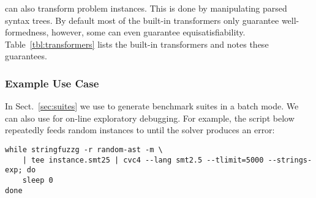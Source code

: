 \fuzzer{} can also transform problem instances.
This is done by manipulating parsed syntax trees.
By default most of the built-in transformers 
only guarantee well-formedness, however,
some can even guarantee equisatisfiability. Table~\ref{tbl:transformers} 
lists the built-in transformers and notes these guarantees.

\subsubsection{Example Use Case}
In Sect.~\ref{sec:suites} we use \fuzzer{} to generate benchmark suites in a batch mode.
We can also use \fuzzer{} for on-line exploratory debugging. 
For example, the script below repeatedly feeds random \fuzzer{} 
instances to \cvc{} until the solver produces an error:
{\scriptsize\begin{verbatim}
while stringfuzzg -r random-ast -m \
    | tee instance.smt25 | cvc4 --lang smt2.5 --tlimit=5000 --strings-exp; do
    sleep 0
done\end{verbatim}}
